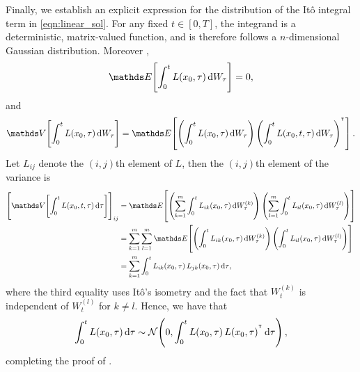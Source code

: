 Finally, we establish an explicit expression for the distribution of the It\^o integral term in \eqref{eqn:linear_sol}.
For any fixed \(t \in [0,T]\), the integrand is a deterministic, matrix-valued function, and is therefore follows a \(n\)-dimensional Gaussian distribution.
Moreover \cite{KallianpurSundar_2014_StochasticAnalysisDiffusion},
\[
	\avg{\int_0^t{L\!\left(x_0, \tau\right)\dif W_\tau}} = 0,
\]
and
\[
	\var{\int_0^t{L\!\left(x_0, \tau\right)\dif W_\tau}} = \avg{\left(\int_0^t{L\!\left(x_0, \tau\right)\dif W_\tau}\right)\left(\int_0^t{L\!\left(x_0, t, \tau\right)\dif W_\tau}\right)^{\T}}.
\]
Let \(L_{ij}\) denote the \((i,j)\)th element of \(L\), then the \((i,j)\)th element of the variance is
\begin{align*}
	\left[\var{\int_0^t{L\!\left(x_0, t, \tau\right)\dif\tau}}\right]_{ij} & = \avg{\left(\sum_{k=1}^m\int_0^t{L_{ik}\!\left(x_0, \tau\right)\dif W_{\tau}^{(k)}}\right)\left(\sum_{l=1}^m\int_0^t{L_{il}\!\left(x_0, \tau\right)\dif W_{\tau}^{(l)}}\right)}   \\
	                                                                       & = \sum_{k=1}^{m}\sum_{l=1}^m\avg{\left(\int_0^t{L_{ik}\!\left(x_0, \tau\right)\dif W_{\tau}^{(k)}}\right)\left(\int_0^t{L_{il}\!\left(x_0, \tau\right)\dif W_{\tau}^{(l)}}\right)} \\
	                                                                       & = \sum_{k=1}^m{\int_0^t{L_{ik}\!\left(x_0, \tau\right)L_{jk}\!\left(x_0, \tau\right)\dif\tau}},
\end{align*}
where the third equality uses It\^o's isometry \cite{KallianpurSundar_2014_StochasticAnalysisDiffusion} and the fact that \(W_t^{(k)}\) is independent of \(W_t^{(l)}\) for \(k \neq l\).
Hence, we have that
\[
	\int_0^t{L\!\left(x_0, \tau\right)\dif\tau} \isGauss{0, \int_0^t{L\!\left(x_0, \tau\right)L\!\left(x_0, \tau\right)^{\T}}\dif\tau},
\]
completing the proof of .




